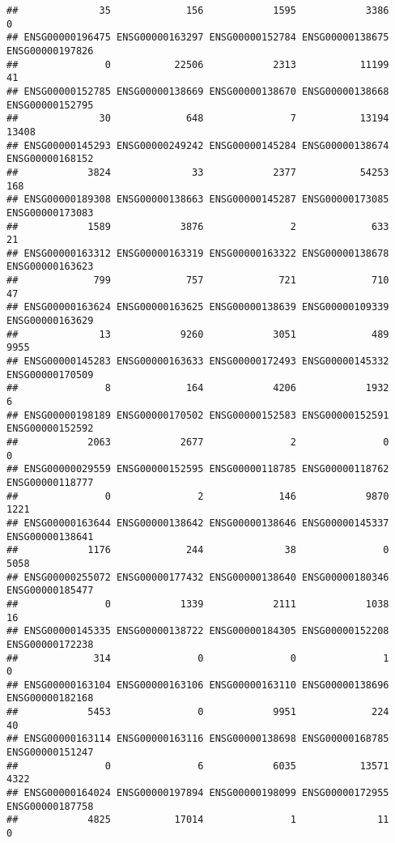 \documentclass[
]{article}
\begin{document}
\begin{verbatim}
##              35             156            1595            3386               0 
## ENSG00000196475 ENSG00000163297 ENSG00000152784 ENSG00000138675 ENSG00000197826 
##               0           22506            2313           11199              41 
## ENSG00000152785 ENSG00000138669 ENSG00000138670 ENSG00000138668 ENSG00000152795 
##              30             648               7           13194           13408 
## ENSG00000145293 ENSG00000249242 ENSG00000145284 ENSG00000138674 ENSG00000168152 
##            3824              33            2377           54253             168 
## ENSG00000189308 ENSG00000138663 ENSG00000145287 ENSG00000173085 ENSG00000173083 
##            1589            3876               2             633              21 
## ENSG00000163312 ENSG00000163319 ENSG00000163322 ENSG00000138678 ENSG00000163623 
##             799             757             721             710              47 
## ENSG00000163624 ENSG00000163625 ENSG00000138639 ENSG00000109339 ENSG00000163629 
##              13            9260            3051             489            9955 
## ENSG00000145283 ENSG00000163633 ENSG00000172493 ENSG00000145332 ENSG00000170509 
##               8             164            4206            1932               6 
## ENSG00000198189 ENSG00000170502 ENSG00000152583 ENSG00000152591 ENSG00000152592 
##            2063            2677               2               0               0 
## ENSG00000029559 ENSG00000152595 ENSG00000118785 ENSG00000118762 ENSG00000118777 
##               0               2             146            9870            1221 
## ENSG00000163644 ENSG00000138642 ENSG00000138646 ENSG00000145337 ENSG00000138641 
##            1176             244              38               0            5058 
## ENSG00000255072 ENSG00000177432 ENSG00000138640 ENSG00000180346 ENSG00000185477 
##               0            1339            2111            1038              16 
## ENSG00000145335 ENSG00000138722 ENSG00000184305 ENSG00000152208 ENSG00000172238 
##             314               0               0               1               0 
## ENSG00000163104 ENSG00000163106 ENSG00000163110 ENSG00000138696 ENSG00000182168 
##            5453               0            9951             224              40 
## ENSG00000163114 ENSG00000163116 ENSG00000138698 ENSG00000168785 ENSG00000151247 
##               0               6            6035           13571            4322 
## ENSG00000164024 ENSG00000197894 ENSG00000198099 ENSG00000172955 ENSG00000187758 
##            4825           17014               1              11               0 

\end{verbatim}
\end{document}
